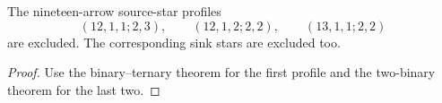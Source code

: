 \begin{corollary}
\label{CP2:A-nineteen-three-large-center-stars}
The nineteen-arrow source-star profiles
\[
 (12,1,1;2,3),\qquad (12,1,2;2,2),\qquad (13,1,1;2,2)
\]
are excluded. The corresponding sink stars are excluded too.
\end{corollary}
\begin{proof}
Use the binary--ternary theorem for the first profile and
the two-binary theorem for the last two.
\end{proof}
